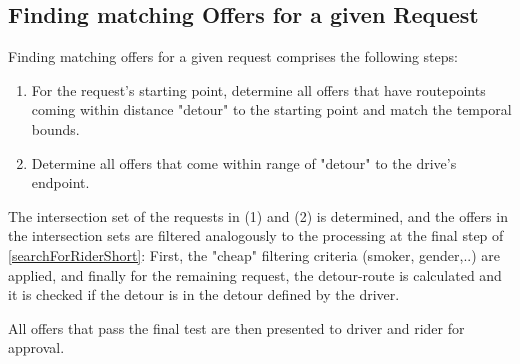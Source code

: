 \subsection{Finding matching Offers for a given Request}
\label{searchForDriverShort}
Finding matching offers for a given request comprises the following steps:

\begin{enumerate}
\item{ For the request's starting point, determine all offers that have 
       routepoints coming within distance "detour" to the starting point 
       and match the temporal bounds.}
\item{Determine all offers that come within range of "detour" to the drive's endpoint.}
\end{enumerate}
The intersection set of the requests in (1) and (2) is determined, and the offers in the intersection sets
are filtered analogously to the processing at the final step of \ref{searchForRiderShort}:
First, the "cheap" filtering criteria (smoker, gender,..) are applied, and finally for the remaining
request, the detour-route is calculated and it is checked if the detour is in the detour defined 
by the driver.

All offers that pass the final test are then presented to driver and rider for approval.

